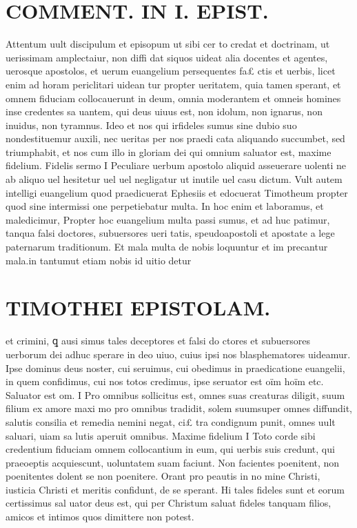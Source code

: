 \documentclass{article}
\begin{document}
\begin{pages}
\section*{COMMENT. IN I. EPIST. }
\marginpar{[ p.106 ]}\pstart Attentum uult discipulum et episopum ut sibi cer to credat et doctrinam, ut uerissimam amplectaiur, non diffi dat siquos uideat alia docentes et agentes, uerosque apostolos, et uerum euangelium persequentes fa£ ctis et uerbis, licet enim ad horam periclitari uidean tur propter ueritatem, quia tamen sperant, et omnem fiduciam collocauerunt in deum, omnia moderantem et omneis homines inse credentes sa uantem, qui deus uiuus est, non idolum, non ignarus, non inuidus, non tyramnus. Ideo et nos qui irfideles sumus sine dubio suo nondestituemur auxili, nec ueritas per nos praedi cata aliquando succumbet, sed triumphabit, et nos cum illo in gloriam dei qui omnium saluator est, maxime fidelium.  \pend\pstart Fidelis sermo I Peculiare uerbum apostolo aliquid asseuerare uolenti ne ab aliquo uel hesitetur uel uel negligatur ut inutile uel casu dictum. Vult autem intelligi euangelium quod praedicuerat Ephesiis et edocuerat Timotheum propter quod sine intermissi one perpetiebatur multa.  \pend\pstart In hoc enim et laboramus, et maledicimur, Propter hoc euangelium multa passi sumus, et ad huc patimur, tanqua falsi doctores, subuersores ueri tatis, speudoapostoli et apostate a lege paternarum traditionum. Et mala multa de nobis loquuntur et im precantur mala.in tantumut etiam nobis id uitio detur  \pend
\section*{TIMOTHEI EPISTOLAM. }
\marginpar{[ p.107 ]}\pstart et crimini, ꝗ ausi simus tales deceptores et falsi do ctores et subuersores uerborum dei adhuc sperare in deo uiuo, cuius ipsi nos blasphematores uideamur. Ipse dominus deus noster, cui seruimus, cui obedimus in praedicatione euangelii, in quem confidimus, cui nos totos credimus, ipse seruator est oïm hoïm etc.  \pend\pstart Saluator est om. I Pro omnibus sollicitus est, omnes suas creaturas diligit, suum filium ex amore maxi mo pro omnibus tradidit, solem suumsuper omnes diffundit, salutis consilia et remedia nemini negat, ci£ tra condignum punit, omnes uult saluari, uiam sa lutis aperuit omnibus.  \pend\pstart Maxime fidelium I Toto corde sibi credentium fiduciam omnem collocantium in eum, qui uerbis suis credunt, qui praeoeptis acquiescunt, uoluntatem suam faciunt. Non facientes poenitent, non poenitentes dolent se non poenitere. Orant pro peautis in no mine Christi, iusticia Christi et meritis confidunt, de se sperant. Hi tales fideles sunt et eorum certissimus sal uator deus est, qui per Christum saluat fideles tanquam filios, amicos et intimos quos dimittere non potest.  \pend
{}
{}

\end{pages}
\end{document}
